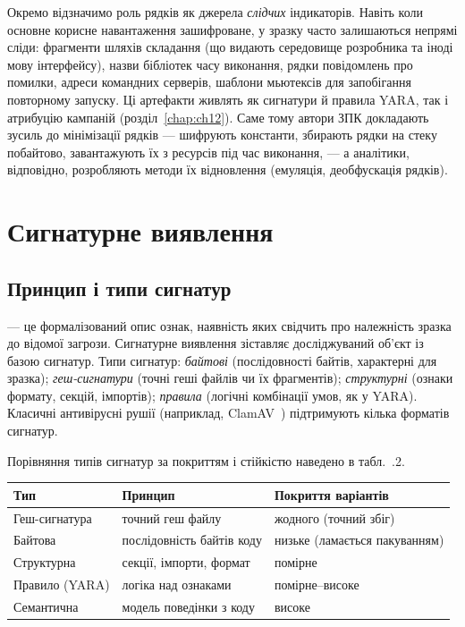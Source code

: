 Окремо відзначимо роль рядків як джерела \emph{слідчих} індикаторів. Навіть коли основне корисне навантаження зашифроване, у зразку часто залишаються непрямі сліди: фрагменти шляхів складання (що видають середовище розробника та іноді мову інтерфейсу), назви бібліотек часу виконання, рядки повідомлень про помилки, адреси командних серверів, шаблони мьютексів для запобігання повторному запуску. Ці артефакти живлять як сигнатури й правила YARA, так і атрибуцію кампаній (розділ~\ref{chap:ch12}). Саме тому автори ЗПК докладають зусиль до мінімізації рядків --- шифрують константи, збирають рядки на стеку побайтово, завантажують їх з ресурсів під час виконання, --- а аналітики, відповідно, розробляють методи їх відновлення (емуляція, деобфускація рядків).

\section{Сигнатурне виявлення}\label{sec:ch06-signatures}

\subsection{Принцип і типи сигнатур}

 --- це формалізований опис ознак, наявність яких свідчить про належність зразка до відомої загрози. Сигнатурне виявлення зіставляє досліджуваний об'єкт із базою сигнатур. Типи сигнатур: \emph{байтові} (послідовності байтів, характерні для зразка); \emph{геш-сигнатури} (точні геші файлів чи їх фрагментів); \emph{структурні} (ознаки формату, секцій, імпортів); \emph{правила} (логічні комбінації умов, як у YARA). Класичні антивірусні рушії (наприклад, ClamAV~\cite{ch06:clamav}) підтримують кілька форматів сигнатур.

Порівняння типів сигнатур за покриттям і стійкістю наведено в табл.~\thechapter.2.


\begin{center}\footnotesize
\begin{tabularx}{\linewidth}{L{20mm} Y L{18mm}}
\toprule
Тип & Принцип & Покриття варіантів \\
\midrule
Геш-сигнатура & точний геш файлу & жодного (точний збіг) \\
Байтова & послідовність байтів коду & низьке (ламається пакуванням) \\
Структурна & секції, імпорти, формат & помірне \\
Правило (YARA) & логіка над ознаками & помірне--високе \\
Семантична & модель поведінки з коду & високе \\
\bottomrule
\end{tabularx}
\end{center}

